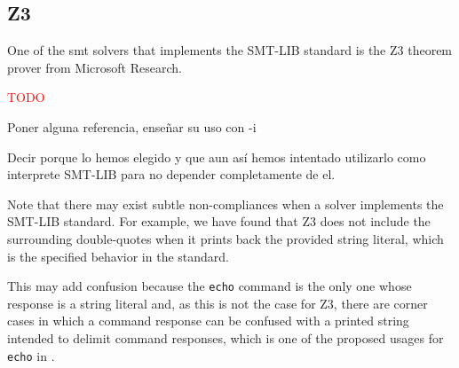 \subsection{Z3}

One of the \acrshort{smt} solvers that implements the SMT-LIB standard is the
Z3 theorem prover from Microsoft Research.

\textcolor{red}{TODO}

Poner alguna referencia, enseñar su uso con -i

Decir porque lo hemos elegido y que aun así hemos intentado utilizarlo como 
interprete SMT-LIB para no depender completamente de el.

Note that there may exist subtle non-compliances when a solver implements the
SMT-LIB standard. For example, we have found that Z3 does not include the
surrounding double-quotes when it prints back the provided string literal,
which is the specified behavior in the standard.

This may add confusion because the \verb|echo| command is the only one whose
response is a string literal and, as this is not the case for Z3, there are 
corner cases in which a command response can be confused with a printed string
intended to delimit command responses, which is one of the proposed usages for
\verb|echo| in \cite{smtLibStandard}.
